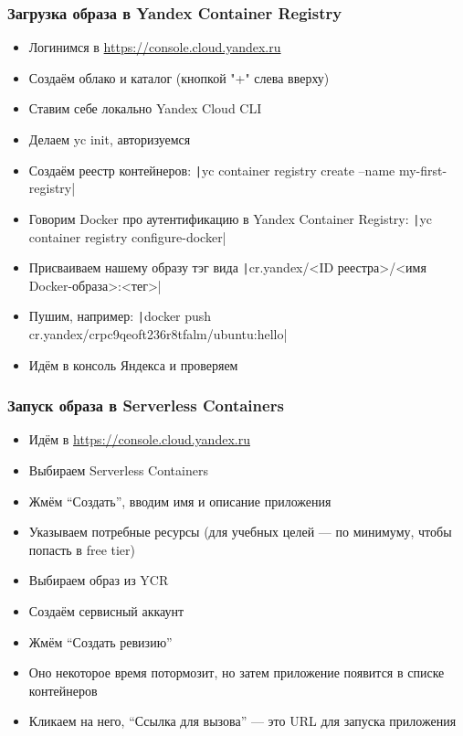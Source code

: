 \documentclass{../../slides-style}
\begin{document}
    \begin{frame}
        \frametitle{Загрузка образа в Yandex Container Registry}
        \begin{itemize}
            \item Логинимся в \url{https://console.cloud.yandex.ru}
            \item Создаём облако и каталог (кнопкой "+" слева  вверху)
            \item Ставим себе локально Yandex Cloud CLI
            \item Делаем yc init, авторизуемся
            \item Создаём реестр контейнеров: \texttt|yc container registry create --name my-first-registry|
            \item Говорим Docker про аутентификацию в Yandex Container Registry: \texttt|yc container registry configure-docker|
            \item Присваиваем нашему образу тэг вида \texttt|cr.yandex/<ID реестра>/<имя Docker-образа>:<тег>|
            \item Пушим, например: \texttt|docker push cr.yandex/crpc9qeoft236r8tfalm/ubuntu:hello|
            \item Идём в консоль Яндекса и проверяем
        \end{itemize}
    \end{frame}

    \begin{frame}
        \frametitle{Запуск образа в Serverless Containers}
        \begin{itemize}
            \item Идём в \url{https://console.cloud.yandex.ru}
            \item Выбираем Serverless Containers
            \item Жмём ``Создать'', вводим имя и описание приложения
            \item Указываем потребные ресурсы (для учебных целей --- по минимуму, чтобы попасть в free tier)
            \item Выбираем образ из YCR
            \item Создаём сервисный аккаунт
            \item Жмём ``Создать ревизию''
            \item Оно некоторое время потормозит, но затем приложение появится в списке контейнеров
            \item Кликаем на него, ``Ссылка для вызова'' --- это URL для запуска приложения
        \end{itemize}
    \end{frame}
\end{document}
